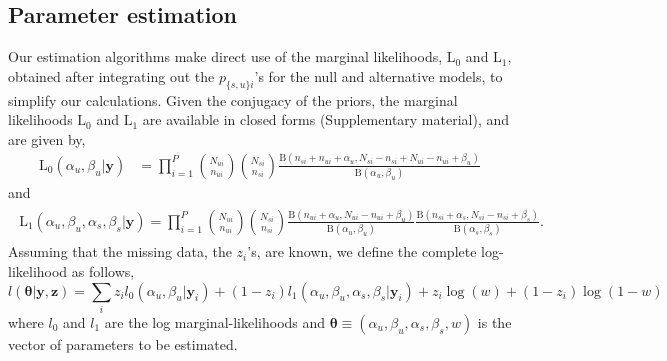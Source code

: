 \documentclass[11pt]{article}
\begin{document}
\subsection{Parameter estimation}
\label{sec:estimation}
Our estimation algorithms make direct use of the marginal likelihoods, $\mathrm{L}_0$ and $\mathrm{L}_1$, obtained after integrating out the $p_{\{s,u\}i}$'s for the null and alternative models, to simplify our calculations. Given the conjugacy of the priors, the marginal likelihoods $\mathrm{L}_0$ and $\mathrm{L}_1$ are available in closed forms (Supplementary material), and are given by,
 \begin{align}
  	\mathrm{L}_0(\alpha_u,\beta_u|\mathbf{y})
	&=\prod_{i=1}^P\binom{N_{ui}}{n_{ui}}\binom{N_{si}}{n_{si}}\frac{\mathrm{B}(n_{si}+n_{ui}+\alpha_u,N_{si}-n_{si}+N_{ui}-n_{ui}+\beta_u)}{\mathrm{B}(\alpha_u,\beta_u)}\label{eq:model1post}
 \end{align} 
and
\begin{align}
	\begin{split}
\mathrm{L}_1(\alpha_u,\beta_u,\alpha_s,\beta_s|\mathbf{y}) 
=\prod_{i=1}^P\binom{N_{ui}}{n_{ui}} \binom{N_{si}}{n_{si}}\frac{\mathrm{B}(n_{ui}+\alpha_u,N_{ui}-n_{ui}+\beta_u)}{\mathrm{B}(\alpha_u,\beta_u)}\frac{\mathrm{B}(n_{si}+\alpha_s,N_{si}-n_{si}+\beta_s)}{\mathrm{B}(\alpha_s,\beta_s)}.\label{model2:unconstrained}
\end{split}
\end{align}
Assuming that the missing data, the $z_i$'s, are known, we define the complete log-likelihood as follows,
\begin{equation}
l(\boldsymbol{\theta}|\mathbf{y},\mathbf{z})=\sum_i z_i l_0(\alpha_u, \beta_u|\mathbf{y}_i) +(1-z_i) l_1(\alpha_u, \beta_u, \alpha_s, \beta_s|\mathbf{y}_i)+z_i\log(w)+(1-z_i)\log(1-w)
\label{eq:cll}
\end{equation}
where $l_0$ and $l_1$ are the log marginal-likelihoods and $\boldsymbol{\theta}\equiv(\alpha_u, \beta_u, \alpha_s,\beta_s, w)$ is the vector of parameters to be estimated.
\end{document}
